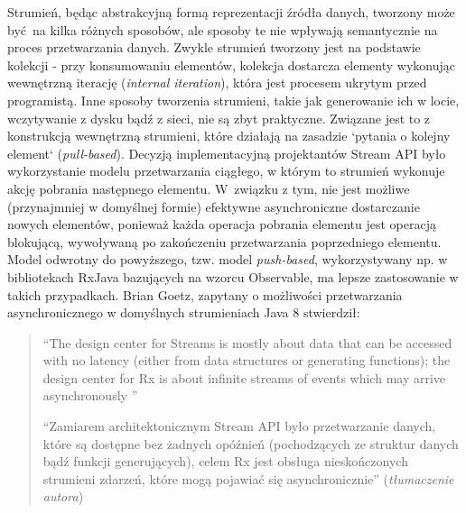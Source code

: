 \documentclass[12pt,twoside,openright]{extarticle}
\begin{document}
    Strumień, będąc abstrakcyjną formą reprezentacji źródła danych, tworzony może być na kilka różnych sposobów, ale sposoby te nie wpływają semantycznie na proces przetwarzania danych. Zwykle strumień tworzony jest na podstawie kolekcji - przy konsumowaniu elementów, kolekcja dostarcza elementy wykonując wewnętrzną iterację (\textit{internal iteration}), która jest procesem ukrytym przed programistą. Inne sposoby tworzenia strumieni, takie jak generowanie ich w locie, wczytywanie z dysku bądź z sieci, nie są zbyt praktyczne. Związane jest to z konstrukcją wewnętrzną strumieni, które działają na zasadzie `pytania o kolejny element` (\textit{pull-based}). Decyzją implementacyjną projektantów Stream API było wykorzystanie modelu przetwarzania ciągłego, w którym to strumień wykonuje akcję pobrania następnego elementu. W~związku z tym, nie jest możliwe (przynajmniej w domyślnej formie) efektywne asynchroniczne dostarczanie nowych elementów, ponieważ każda operacja pobrania elementu jest operacją blokującą, wywoływaną po zakończeniu przetwarzania poprzedniego elementu. Model odwrotny do powyższego, tzw. model \textit{push-based}, wykorzystywany np. w bibliotekach RxJava bazujących na wzorcu Observable, ma lepsze zastosowanie w takich przypadkach. Brian Goetz, zapytany o możliwości przetwarzania asynchronicznego w domyślnych strumieniach Java 8 stwierdził:

\begin{quote}
    ``The design center for Streams is mostly about data that can be accessed with no latency (either from data structures or generating functions); the design center for Rx is about infinite streams of events which may arrive asynchronously \cite{goetz}''

    ``Zamiarem architektonicznym Stream API było przetwarzanie danych, które są dostępne bez żadnych opóźnień (pochodzących ze struktur danych bądź funkcji generujących), celem Rx jest obsługa nieskończonych strumieni zdarzeń, które mogą pojawiać się asynchronicznie''
    (\textit{tłumaczenie autora})

\end{quote}
\end{document}

